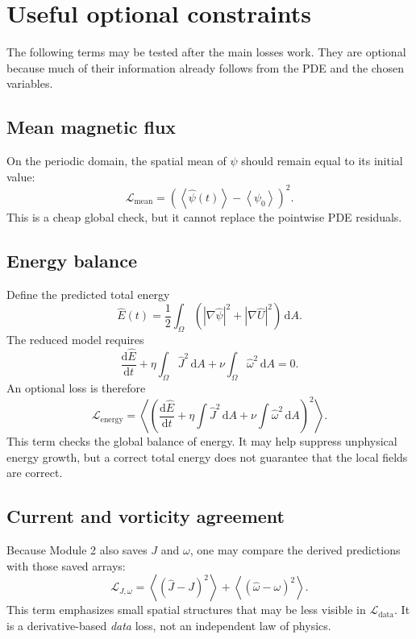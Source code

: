 \documentclass[11pt]{article}
\newcommand{\avg}[1]{\left\langle #1\right\rangle}
\newcommand{\Ldata}{\mathcal L_{\mathrm{data}}}
\newcommand{\Lmean}{\mathcal L_{\mathrm{mean}}}
\newcommand{\Lenergy}{\mathcal L_{\mathrm{energy}}}
\newcommand{\Lderived}{\mathcal L_{J,\omega}}
\begin{document}
\section{Useful optional constraints}

The following terms may be tested after the main losses work. They are optional because much of their information already follows from the PDE and the chosen variables.

\subsection{Mean magnetic flux}

On the periodic domain, the spatial mean of $\psi$ should remain equal to its initial value:
\begin{equation}
\boxed{
\Lmean
=\left(\avg{\widehat\psi(t)}-\avg{\psi_0}\right)^2.
}
\end{equation}
This is a cheap global check, but it cannot replace the pointwise PDE residuals.

\subsection{Energy balance}

Define the predicted total energy
\begin{equation}
\widehat E(t)=\frac12\int_{\Omega}
\left(|\nabla\widehat\psi|^2+|\nabla\widehat U|^2\right)\,\mathrm dA.
\end{equation}
The reduced model requires
\begin{equation}
\frac{\mathrm d\widehat E}{\mathrm dt}
+\eta\int_{\Omega}\widehat J^2\,\mathrm dA
+\nu\int_{\Omega}\widehat\omega^2\,\mathrm dA=0.
\end{equation}
An optional loss is therefore
\begin{equation}
\boxed{
\Lenergy
=\avg{\left(
\frac{\mathrm d\widehat E}{\mathrm dt}
+\eta\int\widehat J^2\,\mathrm dA
+\nu\int\widehat\omega^2\,\mathrm dA
\right)^2}.
}
\end{equation}
This term checks the global balance of energy. It may help suppress unphysical energy growth, but a correct total energy does not guarantee that the local fields are correct.

\subsection{Current and vorticity agreement}

Because Module 2 also saves $J$ and $\omega$, one may compare the derived predictions with those saved arrays:
\begin{equation}
\boxed{
\Lderived
=\avg{(\widehat J-J)^2}
+\avg{(\widehat\omega-\omega)^2}.
}
\end{equation}
This term emphasizes small spatial structures that may be less visible in $\Ldata$. It is a derivative-based \emph{data} loss, not an independent law of physics.
\end{document}
